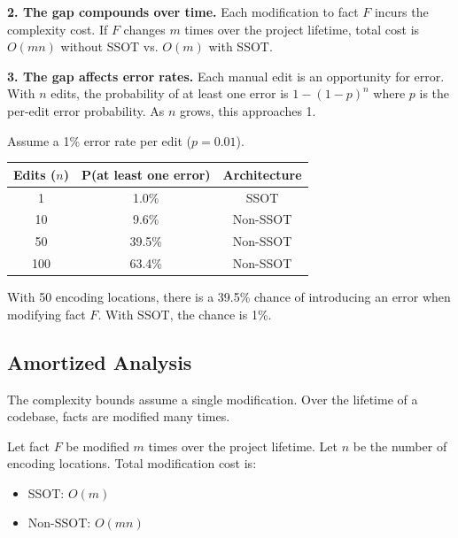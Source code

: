 \textbf{2. The gap compounds over time.} Each modification to fact $F$ incurs the complexity cost. If $F$ changes $m$ times over the project lifetime, total cost is $O(mn)$ without SSOT vs. $O(m)$ with SSOT.

\textbf{3. The gap affects error rates.} Each manual edit is an opportunity for error. With $n$ edits, the probability of at least one error is $1 - (1-p)^n$ where $p$ is the per-edit error probability. As $n$ grows, this approaches 1.

\begin{example}\label{ex:error-rate}
Assume a 1\% error rate per edit ($p = 0.01$).

\begin{center}
\begin{tabular}{ccc}
\toprule
\textbf{Edits ($n$)} & \textbf{P(at least one error)} & \textbf{Architecture} \\
\midrule
1 & 1.0\% & SSOT \\
10 & 9.6\% & Non-SSOT \\
50 & 39.5\% & Non-SSOT \\
100 & 63.4\% & Non-SSOT \\
\bottomrule
\end{tabular}
\end{center}

With 50 encoding locations, there is a 39.5\% chance of introducing an error when modifying fact $F$. With SSOT, the chance is 1\%.
\end{example}

\subsection{Amortized Analysis}\label{sec:amortized}

The complexity bounds assume a single modification. Over the lifetime of a codebase, facts are modified many times.

\begin{theorem}\label{thm:amortized}
Let fact $F$ be modified $m$ times over the project lifetime. Let $n$ be the number of encoding locations. Total modification cost is:
\begin{itemize}
\tightlist
\item SSOT: $O(m)$
\item Non-SSOT: $O(mn)$
\end{itemize}
\end{theorem}

